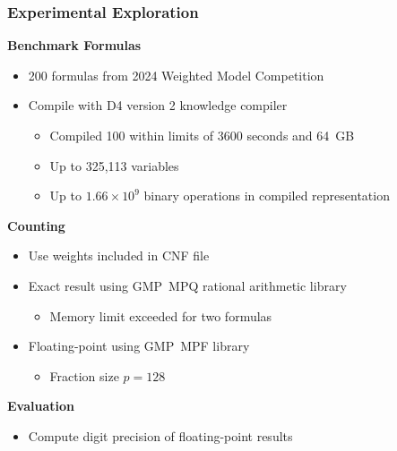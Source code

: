 \documentclass[t,pdf]{beamer}
\newcommand{\bitem}{\item[$\bullet$]}
\begin{document}
\begin{frame}
  \frametitle{Experimental Exploration}

\medskip  

  \textbf{Benchmark Formulas}
  \begin{itemize}
  \item 200 formulas from 2024 Weighted Model Competition
  \item Compile with D4 version 2 knowledge compiler
    \begin{itemize}
    \bitem Compiled 100 within limits of 3600 seconds and 64~GB
    \bitem Up to 325,113 variables
    \bitem Up to $1.66\times 10^9$ binary operations in compiled representation
    \end{itemize}
  \end{itemize}

\medskip

    \textbf{Counting}
    \begin{itemize}
    \item Use weights included in CNF file
    \item Exact result using GMP~MPQ rational arithmetic library
      \begin{itemize}
       \bitem Memory limit exceeded for two formulas
      \end{itemize}
    \item Floating-point using GMP~MPF  library
      \begin{itemize}
       \bitem Fraction size $p = 128$
      \end{itemize}
    \end{itemize}

\medskip

  \textbf{Evaluation}
  \begin{itemize}
  \item Compute digit precision of floating-point results
  \end{itemize}

\end{frame}
\end{document}
